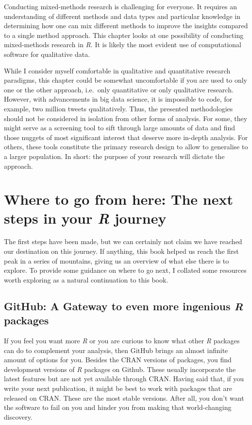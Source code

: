 \documentclass[
  letterpaper,
]{krantz}
\begin{document}
Conducting mixed-methods research is challenging for everyone. It
requires an understanding of different methods and data types and
particular knowledge in determining how one can mix different methods to
improve the insights compared to a single method approach. This chapter
looks at one possibility of conducting mixed-methods research in
\emph{R}. It is likely the most evident use of computational software
for qualitative data.

While I consider myself comfortable in qualitative and quantitative
research paradigms, this chapter could be somewhat uncomfortable if you
are used to only one or the other approach, i.e.~only quantitative or
only qualitative research. However, with advancements in big data
science, it is impossible to code, for example, two million tweets
qualitatively. Thus, the presented methodologies should not be
considered in isolation from other forms of analysis. For some, they
might serve as a screening tool to sift through large amounts of data
and find those nuggets of most significant interest that deserve more
in-depth analysis. For others, these tools constitute the primary
research design to allow to generalise to a larger population. In short:
the purpose of your research will dictate the approach.


\chapter{\texorpdfstring{Where to go from here: The next steps in your
\emph{R}
journey}{Where to go from here: The next steps in your R journey}}\label{next-steps}

The first steps have been made, but we can certainly not claim we have
reached our destination on this journey. If anything, this book helped
us reach the first peak in a series of mountains, giving us an overview
of what else there is to explore. To provide some guidance on where to
go next, I collated some resources worth exploring as a natural
continuation to this book.

\section{\texorpdfstring{GitHub: A Gateway to even more ingenious
\emph{R}
packages}{GitHub: A Gateway to even more ingenious R packages}}\label{next-steps-github}

If you feel you want more \emph{R} or you are curious to know what other
\emph{R} packages can do to complement your analysis, then GitHub brings
an almost infinite amount of options for you. Besides the CRAN versions
of packages, you find development versions of \emph{R} packages on
Github. These usually incorporate the latest features but are not yet
available through CRAN. Having said that, if you write your next
publication, it might be best to work with packages that are released on
CRAN. These are the most stable versions. After all, you don't want the
software to fail on you and hinder you from making that world-changing
discovery.
\end{document}
